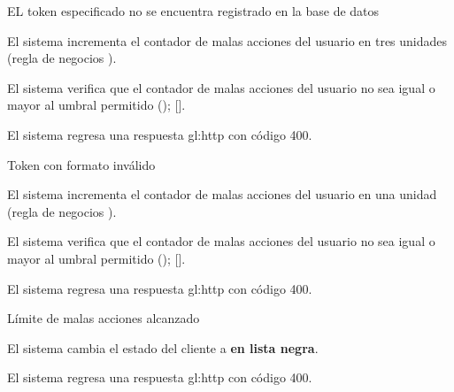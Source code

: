 {\begin{trayectoriaAlternativa}
  \end{trayectoriaAlternativa}


  \begin{trayectoriaAlternativa}
    {EL token especificado no se encuentra registrado en la base de datos}

    \item El sistema incrementa el contador de malas acciones del usuario
      en tres unidades (regla de negocios
      ).

    \item El sistema verifica que el contador de malas acciones del usuario no
      sea igual o mayor al umbral permitido
      ();
      [].

    \item El sistema regresa una respuesta \gls{gl:http} con código 400.

  \end{trayectoriaAlternativa}


  \begin{trayectoriaAlternativa}
    {Token con formato inválido}

    \item El sistema incrementa el contador de malas acciones del usuario
      en una unidad (regla de negocios ).

    \item El sistema verifica que el contador de malas acciones del usuario no
      sea igual o mayor al umbral permitido
      ();
      [].

    \item El sistema regresa una respuesta \gls{gl:http} con código 400.

  \end{trayectoriaAlternativa}


  \begin{trayectoriaAlternativa}
    {Límite de malas acciones alcanzado}

    \item El sistema cambia el estado del cliente a \textbf{en lista negra}.

    \item El sistema regresa una respuesta \gls{gl:http} con código 400.

  \end{trayectoriaAlternativa}
}
